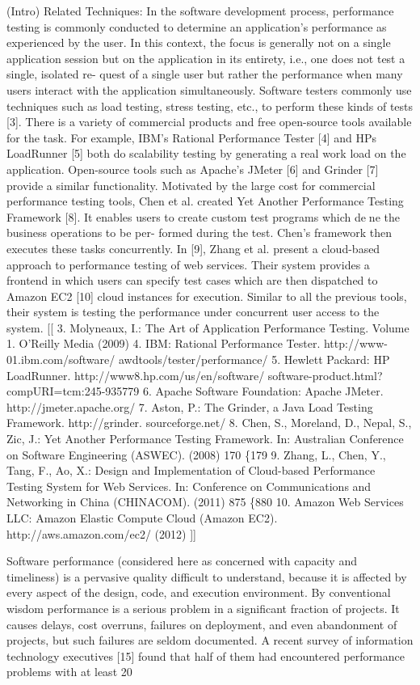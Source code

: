 \documentclass[runningheads,a4paper]{llncs}
\begin{document}
(Intro) Related Techniques: In the software development process, performance testing is 
commonly conducted to determine an application's performance as experienced by the user.
In this context, the focus is generally not on a single application session but
on the application in its entirety, i.e., one does not test a single, isolated re-
quest of a single user but rather the performance when many users interact with
the application simultaneously. Software testers commonly use techniques such
as load testing, stress testing, etc., to perform these kinds of tests [3]. There
is a variety of commercial products and free open-source tools available for the
task. For example, IBM's Rational Performance Tester [4] and HPs LoadRunner
[5] both do scalability testing by generating a real work load on the application.
Open-source tools such as Apache's JMeter [6] and Grinder [7] provide a similar
functionality.
Motivated by the large cost for commercial performance testing tools, Chen
et al. created Yet Another Performance Testing Framework [8]. It enables users
to create custom test programs which dene the business operations to be per-
formed during the test. Chen's framework then executes these tasks concurrently.
In [9], Zhang et al. present a cloud-based approach to performance testing of web
services. Their system provides a frontend in which users can specify test cases
which are then dispatched to Amazon EC2 [10] cloud instances for execution.
Similar to all the previous tools, their system is testing the performance under
concurrent user access to the system.
[[
3. Molyneaux, I.: The Art of Application Performance Testing. Volume 1. O'Reilly
Media (2009)
4. IBM: Rational Performance Tester. http://www-01.ibm.com/software/
awdtools/tester/performance/
5. Hewlett Packard: HP LoadRunner. http://www8.hp.com/us/en/software/
software-product.html?compURI=tcm:245-935779
6. Apache Software Foundation: Apache JMeter. http://jmeter.apache.org/
7. Aston, P.: The Grinder, a Java Load Testing Framework. http://grinder.
sourceforge.net/
8. Chen, S., Moreland, D., Nepal, S., Zic, J.: Yet Another Performance Testing
Framework. In: Australian Conference on Software Engineering (ASWEC). (2008)
170 \{179
9. Zhang, L., Chen, Y., Tang, F., Ao, X.: Design and Implementation of Cloud-based
Performance Testing System for Web Services. In: Conference on Communications
and Networking in China (CHINACOM). (2011) 875 \{880
10. Amazon Web Services LLC: Amazon Elastic Compute Cloud (Amazon EC2).
http://aws.amazon.com/ec2/ (2012)
]]

Software performance (considered here as
concerned with capacity and timeliness) is a pervasive
quality difficult to understand, because it is affected by
every aspect of the design, code, and execution
environment. By conventional wisdom performance is
a serious problem in a significant fraction of projects.
It causes delays, cost overruns, failures on deployment,
and even abandonment of projects, but such failures
are seldom documented. A recent survey of
information technology executives [15] found that half
of them had encountered performance problems with at
least 20%
\end{document}
